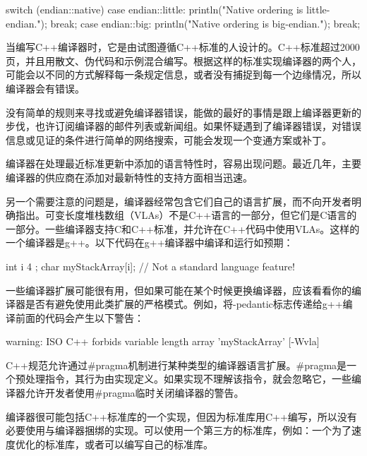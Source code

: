 \begin{cpp}
switch (endian::native)
{
    case endian::little:
        println("Native ordering is little-endian.");
        break;
    case endian::big:
        println("Native ordering is big-endian.");
        break;
}
\end{cpp}


当编写C++编译器时，它是由试图遵循C++标准的人设计的。C++标准超过2000页，并且用散文、伪代码和示例混合编写。根据这样的标准实现编译器的两个人，可能会以不同的方式解释每一条规定信息，或者没有捕捉到每一个边缘情况，所以编译器会有错误。


没有简单的规则来寻找或避免编译器错误，能做的最好的事情是跟上编译器更新的步伐，也许订阅编译器的邮件列表或新闻组。如果怀疑遇到了编译器错误，对错误信息或见证的条件进行简单的网络搜索，可能会发现一个变通方案或补丁。

编译器在处理最近标准更新中添加的语言特性时，容易出现问题。最近几年，主要编译器的供应商在添加对最新特性的支持方面相当迅速。

另一个需要注意的问题是，编译器经常包含它们自己的语言扩展，而不向开发者明确指出。可变长度堆栈数组（VLAs）不是C++语言的一部分，但它们是C语言的一部分。一些编译器支持C和C++标准，并允许在C++代码中使用VLAs。这样的一个编译器是g++。以下代码在g++编译器中编译和运行如预期：

\begin{cpp}
int i { 4 };
char myStackArray[i]; // Not a standard language feature!
\end{cpp}

一些编译器扩展可能很有用，但如果可能在某个时候更换编译器，应该看看你的编译器是否有避免使用此类扩展的严格模式。例如，将-pedantic标志传递给g++编译前面的代码会产生以下警告：

\begin{shell}
warning: ISO C++ forbids variable length array 'myStackArray' [-Wvla]
\end{shell}

C++规范允许通过\#pragma机制进行某种类型的编译器语言扩展。\#pragma是一个预处理指令，其行为由实现定义。如果实现不理解该指令，就会忽略它，一些编译器允许开发者使用\#pragma临时关闭编译器的警告。


编译器很可能包括C++标准库的一个实现，但因为标准库用C++编写，所以没有必要使用与编译器捆绑的实现。可以使用一个第三方的标准库，例如：一个为了速度优化的标准库，或者可以编写自己的标准库。

